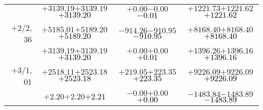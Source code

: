 \documentclass[compress]{beamer}
\begin{document}
\begin{frame}
{\begin{tabular}{r | c | c | c}
           & $+3139.19$\hspace{0.1 cm}$+3139.19$\hspace{0.1 cm}\textcolor{black}{$+3139.20$} & $+0.00$\hspace{0.1 cm}$-0.00$\hspace{0.1 cm}\textcolor{black}{$-0.01$} & $+1221.73$\hspace{0.1 cm}$+1221.62$\hspace{0.1 cm}\textcolor{black}{$+1221.62$} \\
$+$2/2, 36 & $+5185.01$\hspace{0.1 cm}$+5189.20$\hspace{0.1 cm}\textcolor{black}{$+5189.20$} & $-914.26$\hspace{0.1 cm}$-910.95$\hspace{0.1 cm}\textcolor{black}{$-910.95$} & $+8168.40$\hspace{0.1 cm}$+8168.40$\hspace{0.1 cm}\textcolor{black}{$+8168.40$} \\
           & $+3139.19$\hspace{0.1 cm}$+3139.19$\hspace{0.1 cm}\textcolor{black}{$+3139.20$} & $+0.00$\hspace{0.1 cm}$+0.00$\hspace{0.1 cm}\textcolor{black}{$+0.01$} & $+1396.26$\hspace{0.1 cm}$+1396.16$\hspace{0.1 cm}\textcolor{black}{$+1396.16$} \\
$+$3/1, 01 & $+2518.11$\hspace{0.1 cm}$+2523.18$\hspace{0.1 cm}\textcolor{black}{$+2523.18$} & $+219.05$\hspace{0.1 cm}$+223.35$\hspace{0.1 cm}\textcolor{black}{$+223.35$} & $+9226.09$\hspace{0.1 cm}$+9226.09$\hspace{0.1 cm}\textcolor{black}{$+9226.09$} \\
           & $+2.20$\hspace{0.1 cm}$+2.20$\hspace{0.1 cm}\textcolor{black}{$+2.21$} & $-0.00$\hspace{0.1 cm}$+0.00$\hspace{0.1 cm}\textcolor{black}{$+0.00$} & $-1483.84$\hspace{0.1 cm}$-1483.89$\hspace{0.1 cm}\textcolor{black}{$-1483.89$} \\

\end{tabular}}
\end{frame}
\end{document}
